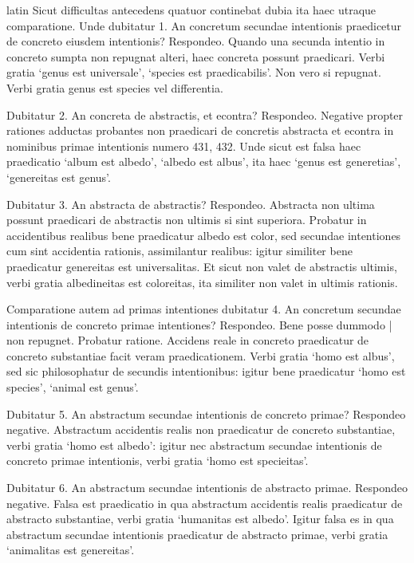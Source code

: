 \begin{otherlanguage*}{latin}
\pstart
  Sicut difficultas antecedens quatuor continebat dubia ita haec utraque comparatione. Unde dubitatur 1. An concretum secundae intentionis praedicetur de concreto eiusdem intentionis? Respondeo. Quando una secunda intentio in concreto sumpta non repugnat alteri, haec concreta possunt praedicari. Verbi gratia `genus est universale', `species est praedicabilis'. Non vero si repugnat. Verbi gratia genus est species vel differentia. 
\pend

\pstart
  Dubitatur 2. An concreta de abstractis, et econtra? Respondeo. Negative propter rationes adductas probantes non praedicari de concretis abstracta et econtra in nominibus primae intentionis numero 431, 432. Unde sicut est falsa haec praedicatio `album est albedo', `albedo est albus', ita haec `genus est generetias', `genereitas est genus'. 
\pend

\pstart
  Dubitatur 3. An abstracta de abstractis? Respondeo. Abstracta non ultima possunt praedicari de abstractis non ultimis si sint superiora. Probatur in accidentibus realibus bene praedicatur albedo est color, sed secundae intentiones cum sint accidentia rationis, assimilantur realibus: igitur similiter bene praedicatur genereitas est universalitas. Et sicut non valet de abstractis ultimis, verbi gratia albedineitas est coloreitas, ita similiter non valet in ultimis rationis. 
\pend

\pstart
  Comparatione autem ad primas intentiones dubitatur 4. An concretum secundae intentionis de concreto primae intentiones? Respondeo. Bene posse dummodo \textnormal{|} non repugnet. Probatur ratione. Accidens reale in concreto praedicatur de concreto substantiae facit veram praedicationem. Verbi gratia `homo est albus', sed sic philosophatur de secundis intentionibus: igitur bene praedicatur `homo est species', `animal est genus'. 
\pend

\pstart
  Dubitatur 5. An abstractum secundae intentionis de concreto primae? Respondeo negative. Abstractum accidentis realis non praedicatur de concreto substantiae, verbi gratia `homo est albedo': igitur nec abstractum secundae intentionis de concreto primae intentionis, verbi gratia `homo est specieitas'. 
\pend

\pstart
  Dubitatur 6. An abstractum secundae intentionis de abstracto primae. Respondeo negative. Falsa est praedicatio in qua abstractum accidentis realis praedicatur de abstracto substantiae, verbi gratia `humanitas est albedo'. Igitur falsa es in qua abstractum secundae intentionis praedicatur de abstracto primae, verbi gratia `animalitas est genereitas'. 
\pend


\end{otherlanguage*}
